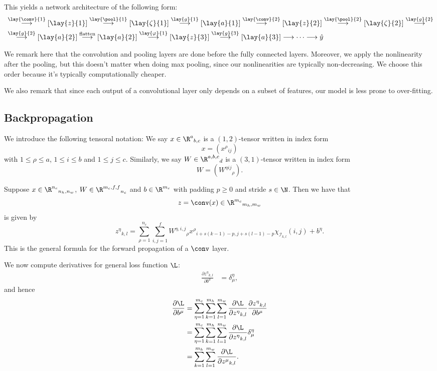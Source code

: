 This yields a network architecture of the following form:
\begin{align*}
	[x]&\overset{\lay{\conv}{1}}{\longrightarrow}[\lay{z}{1}]\overset{\lay{\pool}{1}}{\longrightarrow}[\lay{\zeta}{1}]\overset{\lay{g}{1}}{\longrightarrow}[\lay{a}{1}]\overset{\lay{\conv}{2}}{\longrightarrow}[\lay{z}{2}]\overset{\lay{\pool}{2}}{\longrightarrow}[\lay{\zeta}{2}]\overset{\lay{g}{2}}{\longrightarrow}\\
	&\overset{\lay{g}{2}}{\longrightarrow}[\lay{a}{2}]\overset{\text{flatten}}{\longrightarrow}[\lay{a}{2}]\overset{\lay{\varphi}{1}}{\longrightarrow}[\lay{z}{3}]\overset{\lay{g}{3}}{\longrightarrow}[\lay{a}{3}]\longrightarrow\cdots\longrightarrow\hat{y}
\end{align*}

We remark here that the convolution and pooling layers are done before the fully connected layers.  Moreover, we apply the nonlinearity after the pooling, but this doesn't matter when doing max pooling, since our nonlinearities are typically non-decreasing.  We choose this order because it's typically computationally cheaper.  

We also remark that since each output of a convolutional layer only depends on a subset of features, our model is less prone to over-fitting.




\subsection{Backpropagation}

We introduce the following tensoral notation:  We say $x\in\R^a{_{b,c}}$ is a $(1,2)$-tensor written in index form
$$x=(x^\rho{_{ij}})$$
with $1\leq \rho\leq a$, $1\leq i\leq b$ and $1\leq j\leq c$.  Similarly, we say $W\in\R^{a,b,c}{_d}$ is a $(3,1)$-tensor written in index form
$$W=(W^{\eta ij}{_\rho}).$$

Suppose $x\in\R^{n_c}{_{n_h,n_w}}$, $W\in\R^{m_c,f,f}{_{n_c}}$ and $b\in\R^{m_c}$ with padding $p\geq0$ and stride $s\in\N$.  Then we have that
$$z=\conv(x)\in\R^{m_c}{_{m_h,m_w}}$$
is given by
$$z{^\eta}{_{k,l}}=\sum_{\rho=1}^{n_c}\sum_{i,j=1}^fW^{\eta,i,j}{_\rho}x^\rho{_{i+s(k-1)-p,j+s(l-1)-p}}\chi_{\mathcal{I}_{k,l}}(i,j)+b^\eta.$$
This is the general formula for the forward propagation of a $\conv$ layer.

We now compute derivatives for general loss function $\L$:
\begin{align*}
	\frac{\partial z{^\eta}{_{k,l}}}{\partial b^\mu}&=\delta^\eta_\mu,
\end{align*}
and hence
\begin{align*}
	\frac{\partial\L}{\partial b^\mu}&=\sum_{\eta=1}^{m_c}\sum_{k=1}^{m_h}\sum_{l=1}^{m_w}\frac{\partial\L}{\partial z^\eta{_{k,l}}}\frac{\partial z^\eta{_{k,l}}}{\partial b^\mu}\\
	&=\sum_{\eta=1}^{m_c}\sum_{k=1}^{m_h}\sum_{l=1}^{m_w}\frac{\partial\L}{\partial z^\eta{_{k,l}}}\delta^\eta_\mu\\
	&=\sum_{k=1}^{m_h}\sum_{l=1}^{m_w}\frac{\partial\L}{\partial z^\mu{_{k,l}}}.
\end{align*}


